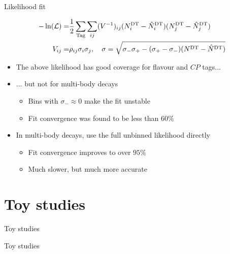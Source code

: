 \documentclass{beamer}
\begin{document}
\begin{frame}{Likelihood fit}
  \vspace{-0.5cm}
  \begin{center}
    \begin{align*}
      -\ln(\mathcal{L}) =& \frac{1}{2}\sum_{\rm Tag}\sum_{ij}(V^{-1})_{ij}(N^{\rm DT}_i - \hat{N}^{\rm DT}_i)(N^{\rm DT}_j - \hat{N}^{\rm DT}_j) \\
      V_{ij} =& \rho_{ij}\sigma_i\sigma_j, \quad \sigma = \sqrt{\sigma_-\sigma_+ - (\sigma_+ - \sigma_-)(N^{\rm DT} - \hat{N}^{\rm DT})}
    \end{align*}
  \end{center}
  \begin{itemize}
    \setlength\itemsep{1.0em}
    \item{The above likelihood has good coverage for flavour and $C\!P$ tags...}
    \item{... but not for multi-body decays}
    \begin{itemize}
      \item{Bins with $\sigma_-\approx0$ make the fit unstable}
      \item{Fit convergence was found to be less than $60\%$}
    \end{itemize}
    \item{In multi-body decays, use the full unbinned likelihood directly}
    \begin{itemize}
      \item{Fit convergence improves to over $95\%$}
      \item{Much slower, but much more accurate}
    \end{itemize}
  \end{itemize}
\end{frame}

\section{Toy studies}
\begin{frame}{Toy studies}
  \begin{center}
    {\huge Toy studies}
  \end{center}
\end{frame}
\end{document}
